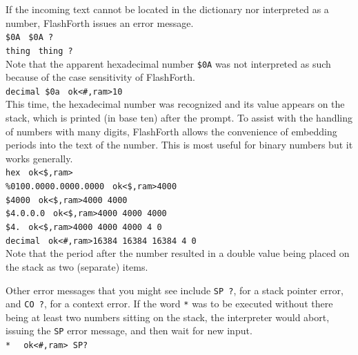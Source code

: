 \documentclass[12pt,a4paper]{article}
\begin{document}
\medskip
If the incoming text cannot be located in the dictionary nor interpreted as a number,
FlashForth issues an error message. \vspace{7pt} \\
\verb!$0A ! \fbox{$\hookleftarrow$} \verb!$0A ?! \vspace{7pt} \\
\verb!thing ! \fbox{$\hookleftarrow$} \verb!thing ?! \vspace{7pt} \\
Note that the apparent hexadecimal number \verb!$0A! was not interpreted as such 
because of the case sensitivity of FlashForth. \vspace{7pt} \\
\verb!decimal $0a ! \fbox{$\hookleftarrow$} \verb!ok<#,ram>10 ! \vspace{7pt} \\
This time, the hexadecimal number was recognized and its value appears on the stack,
which is printed (in base ten) after the prompt.
To assist with the handling of numbers with many digits,
FlashForth allows the convenience of embedding periods into the text of the number.
This is most useful for binary numbers but it works generally. \vspace{7pt} \\
\verb!hex ! \fbox{$\hookleftarrow$} \verb!ok<$,ram> ! \vspace{7pt} \\
\verb!%0100.0000.0000.0000 ! \fbox{$\hookleftarrow$} \verb!ok<$,ram>4000 ! \vspace{7pt} \\
\verb!$4000 ! \fbox{$\hookleftarrow$} \verb!ok<$,ram>4000 4000 ! \vspace{7pt} \\
\verb!$4.0.0.0 ! \fbox{$\hookleftarrow$} \verb!ok<$,ram>4000 4000 4000 ! \vspace{7pt} \\
\verb!$4. ! \fbox{$\hookleftarrow$} \verb!ok<$,ram>4000 4000 4000 4 0 ! \vspace{7pt} \\
\verb!decimal ! \fbox{$\hookleftarrow$} \verb!ok<#,ram>16384 16384 16384 4 0 ! \vspace{7pt} \\
Note that the period after the number resulted in a double value being placed 
on the stack as two (separate) items.

\medskip
Other error messages that you might see include \verb!SP ?!, for a stack pointer error, 
and \verb!CO ?!, for a context error.
If the word \verb!*! was to be executed without there being at least two numbers sitting 
on the stack, the interpreter would abort, issuing the \verb!SP! error message, 
and then wait for new input. \vspace{7pt} \\
\verb!*  ! \fbox{$\hookleftarrow$} \verb!ok<#,ram> SP? ! 
\end{document}
